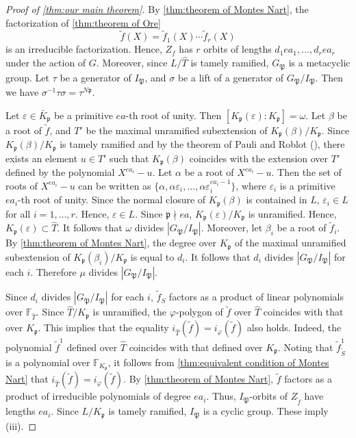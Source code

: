 \documentclass{article}
\newcommand{\field}[1]{\mathbb{#1}}
\theoremstyle{definition}
\theoremstyle{remark}
\numberwithin{equation}{section}
\begin{document}
\begin{proof}[Proof of \cref{thm:our main theorem}]
  By \cref{thm:theorem of Montes Nart}, the factorization of \cref{thm:theorem of Ore} 
  \[
    \tilde{f}(X) = \tilde{f}_1(X) \cdots \tilde{f}_r(X)
  \]
  is an irreducible factorization. Hence, $Z_f$ has $r$ orbits of lengths $d_1 ea_1, \dots ,d_r ea_r$ under the action of $G$. 
  Moreover, since $L/\hat{T}$ is tamely ramified, $G_{\mathfrak{P}}$ is a metacyclic group. 
  Let $\tau$ be a generator of $I_{\mathfrak{P}}$, and $\sigma$ be a lift of a generator of $G_{\mathfrak{P}}/I_{\mathfrak{P}}$. 
  Then we have $\sigma^{-1}\tau\sigma = \tau^{N\mathfrak{p}}$. 

  Let $\varepsilon \in \bar{K}_{\mathfrak{p}}$ be a primitive $ea$-th root of unity. 
  Then $[K_{\mathfrak{p}}(\varepsilon):K_{\mathfrak{p}}] = \omega$. 
  Let $\beta$ be a root of $\tilde{f}$, and $T'$ be the maximal unramified subextension of $K_{\mathfrak{p}}(\beta)/K_{\mathfrak{p}}$. 
  Since $K_{\mathfrak{p}}(\beta)/K_{\mathfrak{p}}$ is tamely ramified and by the theorem of Pauli and Roblot (\cite[Theorem 7.2]{MR1836924}), 
  there exists an element $u \in T'$ such that $K_{\mathfrak{p}}(\beta)$ coincides with the extension over $T'$ defined by the polynomial $X^{ea_i} - u$. 
  Let $\alpha$ be a root of $X^{ea_i} - u$. Then the set of roots of $X^{ea_i} - u$ can be written as $\{\alpha,\alpha\varepsilon_i,\dots,\alpha\varepsilon_i^{ea_i-1}\}$, 
  where $\varepsilon_i$ is a primitive $ea_i$-th root of unity. 
  Since the normal closure of $K_{\mathfrak{p}}(\beta)$ is contained in $L$, $\varepsilon_i \in L$ for all $i=1, \dots ,r$. 
  Hence, $\varepsilon \in L$. 
  Since $\mathfrak{p} \nmid ea$, $K_{\mathfrak{p}}(\varepsilon)/K_{\mathfrak{p}}$ is unramified. Hence, $K_{\mathfrak{p}}(\varepsilon) \subset \hat{T}$. 
  It follows that $\omega$ divides $|G_{\mathfrak{P}}/I_{\mathfrak{P}}|$. 
  Moreover, let $\beta_i$ be a root of $\tilde{f}_i$. 
  By \cref{thm:theorem of Montes Nart}, the degree over $K_{\mathfrak{p}}$ of the maximal unramified subextension of $K_{\mathfrak{p}}(\beta_i)/K_{\mathfrak{p}}$ 
  is equal to $d_i$. It follows that $d_i$ divides $|G_{\mathfrak{P}}/I_{\mathfrak{P}}|$ for each $i$. 
  Therefore $\mu$ divides $|G_{\mathfrak{P}}/I_{\mathfrak{P}}|$. 

  Since $d_i$ divides $|G_{\mathfrak{P}}/I_{\mathfrak{P}}|$ for each $i$, $\tilde{f}_S$ factors as a product of linear polynomials over $\field{F}_{\hat{T}}$. 
  Since $\hat{T}/K_{\mathfrak{p}}$ is unramified, the $\varphi$-polygon of $\tilde{f}$ over $\hat{T}$ coincides with that over $K_{\mathfrak{p}}$. 
  This implies that the equality $i_{\hat{T}}(\tilde{f}) = i_{\varphi}(\tilde{f})$ also holds. 
  Indeed, the polynomial $\tilde{f}^1$ defined over $\hat{T}$ coincides with that defined over $K_{\mathfrak{p}}$. 
  Noting that $\tilde{f}^1_{\tilde{S}}$ is a polynomial over $\field{F}_{K_{\mathfrak{p}}}$, it follows from \cref{thm:equivalent condition of Montes Nart} that 
  $i_{\hat{T}}(\tilde{f}) = i_{\varphi}(\tilde{f})$. 
  By \cref{thm:theorem of Montes Nart}, $\tilde{f}$ factors as a product of irreducible polynomials of degree $ea_i$. 
  Thus, $I_{\mathfrak{P}}$-orbits of $Z_{\tilde{f}}$ have lengths $ea_i$. 
  Since $L/K_{\mathfrak{p}}$ is tamely ramified, $I_{\mathfrak{P}}$ is a cyclic group. 
  These imply (iii). 


\end{proof}
\end{document}
